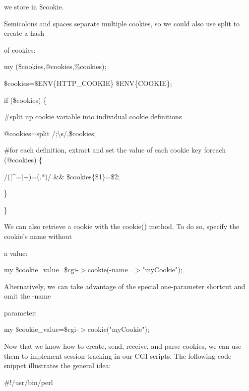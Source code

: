 \documentclass[a4paper,11pt]{book}
\begin{document}
\noindent we store in \$cookie.

\noindent 

\noindent Semicolons  and  spaces  separate  multiple  cookies,  so  we  could  also  use  split to  create  a  hash

\noindent of cookies:

\noindent 

\noindent my (\$cookies,@cookies,\%cookies);

\noindent \$cookies=\$ENV\{HTTP\_COOKIE\} \textbar \textbar  \$ENV\{COOKIE\};

\noindent if (\$cookies) \{

\noindent \#split up cookie variable into individual cookie definitions

\noindent @cookies=split /;\textbackslash s/,\$cookies;

\noindent 

\noindent \#for each definition, extract and set the value of each cookie key foreach (@cookies) \{

\noindent /([\^{}=]+)=(.*)/ \&\& \$cookies\{\$1\}=\$2;

\noindent \}

\noindent \}

\noindent 

\noindent 

\noindent We can also retrieve a cookie with the cookie() method. To do so, specify the cookie's name without

\noindent a value:

\noindent 

\noindent my \$cookie\_value=\$cgi-$>$cookie(-name=$>$"myCookie");

\noindent 

\noindent Alternatively, we can take advantage of the special one-parameter shortcut and omit the -name

\noindent parameter:

\noindent 

\noindent my \$cookie\_value=\$cgi-$>$cookie("myCookie");

\noindent 

\noindent Now that we know how to create, send, receive, and parse cookies, we can use them to implement session tracking in our CGI scripts. The following code snippet illustrates the general idea:

\noindent 

\noindent 

\noindent \#!/usr/bin/perl
\end{document}
